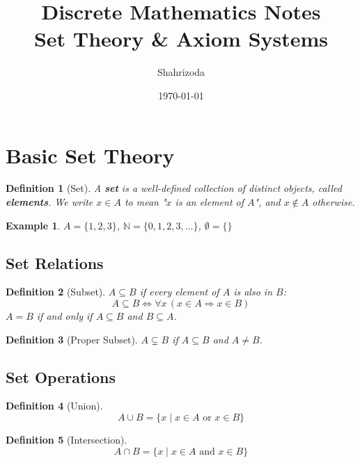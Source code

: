 \documentclass[12pt, a4paper]{article}
\title{\textbf{Discrete Mathematics Notes} \\ \large Set Theory \& Axiom Systems}
\author{Shahrizoda}
\date{\today}
\newtheorem{definition}{Definition}[section]
\newtheorem{example}{Example}[section]
\begin{document}
\maketitle
\tableofcontents
\newpage

\section{Basic Set Theory}

\begin{definition}[Set]
A \textbf{set} is a well-defined collection of distinct objects, called \textbf{elements}.
We write $x \in A$ to mean "$x$ is an element of $A$", and $x \notin A$ otherwise.
\end{definition}

\begin{example}
$A = \{1, 2, 3\}$, \quad $\mathbb{N} = \{0, 1, 2, 3, \ldots\}$, \quad $\emptyset = \{\}$
\end{example}

\subsection{Set Relations}

\begin{definition}[Subset]
$A \subseteq B$ if every element of $A$ is also in $B$:
$$A \subseteq B \iff \forall x \, (x \in A \Rightarrow x \in B)$$
$A = B$ if and only if $A \subseteq B$ and $B \subseteq A$.
\end{definition}

\begin{definition}[Proper Subset]
$A \subsetneq B$ if $A \subseteq B$ and $A \neq B$.
\end{definition}

\subsection{Set Operations}

\begin{definition}[Union]
$$A \cup B = \{ x \mid x \in A \text{ or } x \in B \}$$
\end{definition}

\begin{definition}[Intersection]
$$A \cap B = \{ x \mid x \in A \text{ and } x \in B \}$$
\end{definition}
\end{document}
